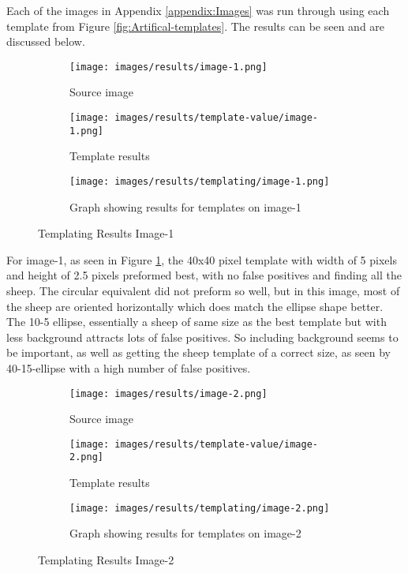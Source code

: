 Each of the images in Appendix \ref{appendix:Images} was run through using each template from Figure \ref{fig:Artifical-templates}. The results can be seen and are discussed below.


\begin{figure}[H]
    \centering
    
    \begin{subfigure}{0.5\textwidth}
        \centering
        \texttt{[image: images/results/image-1.png]}
        \caption{Source image}
    \end{subfigure}%
    \begin{subfigure}{0.5\textwidth}
        \centering
        \texttt{[image: images/results/template-value/image-1.png]}
        \caption{Template results}
    \end{subfigure}
    \begin{subfigure}{\textwidth}
    \centering
        \texttt{[image: images/results/templating/image-1.png]}
        \caption{Graph showing results for templates on image-1}
    \end{subfigure}
    
    \caption{Templating Results Image-1}
    \label{fig:Templating-Results-Image-1}
\end{figure}

For image-1, as seen in  Figure \ref{fig:Templating-Results-Image-1}, the 40x40 pixel template with width of 5 pixels and height of 2.5 pixels preformed best, with no false positives and finding all the sheep. The circular equivalent did not preform so well, but in this image, most of the sheep are oriented horizontally which does match the ellipse shape better. The 10-5 ellipse, essentially a sheep of same size as the best template but with less background attracts lots of false positives. So including background seems to be important, as well as getting the sheep template of a correct size, as seen by 40-15-ellipse with a high number of false positives.



\begin{figure}[H]
    \centering
    
    \begin{subfigure}{0.5\textwidth}
        \centering
        \texttt{[image: images/results/image-2.png]}
        \caption{Source image}
    \end{subfigure}%
    \begin{subfigure}{0.5\textwidth}
        \centering
        \texttt{[image: images/results/template-value/image-2.png]}
        \caption{Template results}
    \end{subfigure}
    \begin{subfigure}{\textwidth}
    \centering
        \texttt{[image: images/results/templating/image-2.png]}
        \caption{Graph showing results for templates on image-2}
    \end{subfigure}
    
    \caption{Templating Results Image-2}
    \label{fig:Templating-Results-Image-2}
\end{figure}

